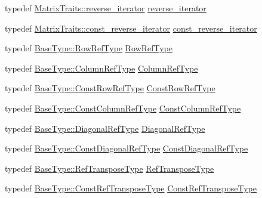 \begin{DoxyCompactItemize}
\item 
typedef \hyperlink{classvct_fixed_size_matrix_traits_aa132098455575ae9bc4962c994273baa}{Matrix\+Traits\+::reverse\+\_\+iterator} \hyperlink{classvct_fixed_size_matrix_base_aa437178891b922bbc199cd059d2a79fe}{reverse\+\_\+iterator}
\item 
typedef \hyperlink{classvct_fixed_size_matrix_traits_a362cff0931f811552609307e80af3eab}{Matrix\+Traits\+::const\+\_\+reverse\+\_\+iterator} \hyperlink{classvct_fixed_size_matrix_base_a82f39f6102bda23fe977efe94ebf06dd}{const\+\_\+reverse\+\_\+iterator}
\item 
typedef \hyperlink{classvct_fixed_size_const_matrix_base_a2ce1bc7d955f66d28462cb34b62d69b7}{Base\+Type\+::\+Row\+Ref\+Type} \hyperlink{classvct_fixed_size_matrix_base_a99d07082e6588c81902cf19226ebf93b}{Row\+Ref\+Type}
\item 
typedef \hyperlink{classvct_fixed_size_const_matrix_base_a9cbbc3a040a90709bdeac3b94c766131}{Base\+Type\+::\+Column\+Ref\+Type} \hyperlink{classvct_fixed_size_matrix_base_a59c0bb73e3e0a4d1daea3a017eceaac7}{Column\+Ref\+Type}
\item 
typedef \hyperlink{classvct_fixed_size_const_matrix_base_a74355396eec7437755398c2810e0df41}{Base\+Type\+::\+Const\+Row\+Ref\+Type} \hyperlink{classvct_fixed_size_matrix_base_a506ec116d1e4c9c1b5d89f9f952e5b2d}{Const\+Row\+Ref\+Type}
\item 
typedef \hyperlink{classvct_fixed_size_const_matrix_base_a68ed47f84a2855832fa0c18fafda6843}{Base\+Type\+::\+Const\+Column\+Ref\+Type} \hyperlink{classvct_fixed_size_matrix_base_a5ef3c78aaccbfe9c5e4843bffa2770b5}{Const\+Column\+Ref\+Type}
\item 
typedef \hyperlink{classvct_fixed_size_const_matrix_base_ae0b335e845233b49e01f24c1518ee6a1}{Base\+Type\+::\+Diagonal\+Ref\+Type} \hyperlink{classvct_fixed_size_matrix_base_af379c84a0eb55ebfac0c6bf715eb28e3}{Diagonal\+Ref\+Type}
\item 
typedef \hyperlink{classvct_fixed_size_const_matrix_base_a54699d7dbe28072365fab4aa99c68d66}{Base\+Type\+::\+Const\+Diagonal\+Ref\+Type} \hyperlink{classvct_fixed_size_matrix_base_a34c960d927329c09d97b6b69196c2cbe}{Const\+Diagonal\+Ref\+Type}
\item 
typedef \hyperlink{classvct_fixed_size_const_matrix_base_a8d6e7ad2cf2cd82aebbc3de0d6479dbe}{Base\+Type\+::\+Ref\+Transpose\+Type} \hyperlink{classvct_fixed_size_matrix_base_aaddf4b1c77971ed669535edb04d02628}{Ref\+Transpose\+Type}
\item 
typedef \hyperlink{classvct_fixed_size_const_matrix_base_a41d41a9a3dc6d0c8e36348a8c2fc83db}{Base\+Type\+::\+Const\+Ref\+Transpose\+Type} \hyperlink{classvct_fixed_size_matrix_base_abea4d6acc16784903d485542c24d8446}{Const\+Ref\+Transpose\+Type}

\end{DoxyCompactItemize}
